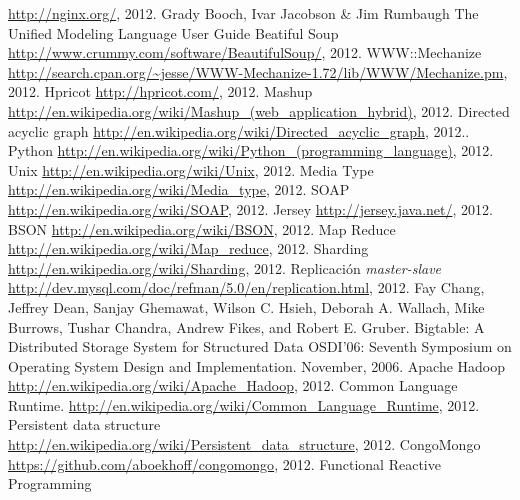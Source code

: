 \documentclass[a4paper,12pt,twoside]{report}
\begin{document}
\begin{thebibliography}{1}
  \newblock \url{http://nginx.org/}, 2012.
  Grady Booch, Ivar Jacobson \& Jim Rumbaugh
  \newblock The Unified Modeling Language User Guide
  \newblock Beatiful Soup
  \newblock \url{http://www.crummy.com/software/BeautifulSoup/}, 2012.
  \newblock WWW::Mechanize
  \newblock
  \url{http://search.cpan.org/~jesse/WWW-Mechanize-1.72/lib/WWW/Mechanize.pm},
  2012.
  \newblock Hpricot
  \newblock \url{http://hpricot.com/}, 2012.
  \newblock Mashup
  \newblock \url{http://en.wikipedia.org/wiki/Mashup_(web_application_hybrid)}, 2012.
  \newblock Directed acyclic graph
  \newblock \url{http://en.wikipedia.org/wiki/Directed_acyclic_graph},
  2012..
  \newblock Python
  \newblock
  \url{http://en.wikipedia.org/wiki/Python_(programming_language)}, 2012.
  \newblock Unix
  \newblock \url{http://en.wikipedia.org/wiki/Unix}, 2012.
  \newblock Media Type
  \newblock \url{http://en.wikipedia.org/wiki/Media_type}, 2012.
  \newblock SOAP
  \newblock \url{http://en.wikipedia.org/wiki/SOAP}, 2012.
  \newblock Jersey
  \newblock \url{http://jersey.java.net/}, 2012.
  \newblock BSON
  \newblock \url{http://en.wikipedia.org/wiki/BSON}, 2012.
  \newblock Map Reduce
  \newblock \url{http://en.wikipedia.org/wiki/Map_reduce}, 2012.
  \newblock Sharding
  \newblock \url{http://en.wikipedia.org/wiki/Sharding}, 2012.
  \newblock Replicación \emph{master-slave}
  \newblock
  \url{http://dev.mysql.com/doc/refman/5.0/en/replication.html}, 2012.
  Fay Chang, Jeffrey Dean, Sanjay Ghemawat, Wilson C. Hsieh, Deborah A. Wallach, Mike Burrows, Tushar Chandra, Andrew Fikes, and Robert E. Gruber.
  \newblock Bigtable: A Distributed Storage System for Structured Data
  \newblock OSDI'06: Seventh Symposium on Operating System Design and
  Implementation. November, 2006.
  \newblock Apache Hadoop
  \newblock \url{http://en.wikipedia.org/wiki/Apache_Hadoop}, 2012.
  \newblock Common Language Runtime.
  \newblock
  \url{http://en.wikipedia.org/wiki/Common_Language_Runtime}, 2012.
  \newblock Persistent data structure
  \newblock
  \url{http://en.wikipedia.org/wiki/Persistent_data_structure}, 2012.
  \newblock CongoMongo
  \newblock \url{https://github.com/aboekhoff/congomongo}, 2012.
  \newblock Functional Reactive Programming

\end{thebibliography}
\end{document}
